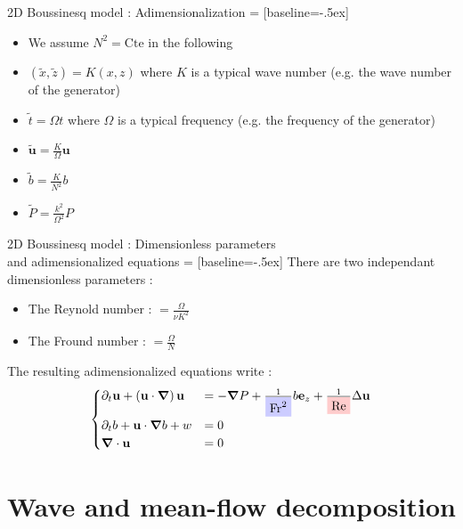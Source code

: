 \documentclass[10pt]{beamer}
\newcommand{\NodeFill}[3]{\tikz[baseline]{\node[fill=#1!20,anchor=base](#2){#3};}}
\begin{document}
\begin{frame}[fragile]{2D Boussinesq model : Adimensionalization}
   = [baseline=-.5ex]
  \begin{itemize}
  	\item We assume $N^{2}=\mathrm{Cte}$ in the following
    \item $\left(\tilde{x},\tilde{z}\right)=K\left(x,z\right)$ where $K$ is a typical wave number (e.g. the wave number of the generator)
    \item $\tilde{t}=\Omega t$ where $\Omega$ is a typical frequency (e.g. the frequency of the generator)
    \item $\tilde{\mathbf{u}}=\frac{K}{\Omega}\mathbf{u}$
    \item $\tilde{b}=\frac{K}{N^{2}}b$
    \item $\tilde{P}=\frac{k^{2}}{\Omega^{2}}P$
  \end{itemize}
\end{frame}

\begin{frame}[fragile]{2D Boussinesq model : Dimensionless parameters \\and adimensionalized equations}
   = [baseline=-.5ex]
  There are two independant dimensionless parameters :
  \begin{itemize}
    \item The Reynold number : \NodeFill{red}{}{$\mathrm{Re}$}$=\frac{\Omega}{\nu K^{2}}$
    \item The Fround number : \NodeFill{blue}{}{$\mathrm{Fr}$}$=\frac{\Omega}{N}$
  \end{itemize}
  The resulting adimensionalized equations write :
  \begin{equation*}
    \begin{cases}
    \partial_{t}\mathbf{u}+\left(\mathbf{u}\cdot\boldsymbol{\nabla}\right)\mathbf{u} & = -\boldsymbol{\nabla}P+\frac{1}{\NodeFill{blue}{}{$\mathrm{Fr}^{2}$}}b\mathbf{e}_{z}+\frac{1}{\NodeFill{red}{}{$\mathrm{Re}$}}\Delta\mathbf{u} \\ 
    \partial_{t}b+\mathbf{u}\cdot\boldsymbol{\nabla}b+w& =0\\ 
    \boldsymbol{\nabla}\cdot\mathbf{u}& =0
    \end{cases}
  \end{equation*}
\end{frame}

\section{Wave and mean\--flow decomposition}
\end{document}
